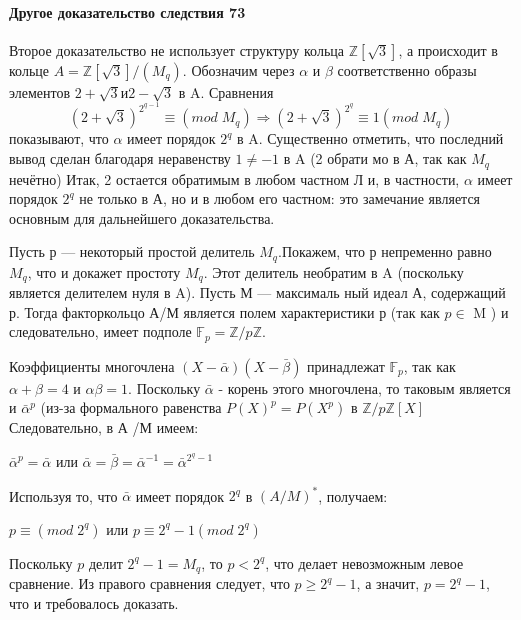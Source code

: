 \documentclass{mai_book}
\begin{document}
	\paragraph{Другое доказательство следствия 73}
	\noindent
	
	Второе доказательство не использует структуру кольца $\mathbb Z[\sqrt{3}]$, а	происходит в кольце $A =\mathbb Z[\sqrt{3}] /(M_q).$ Обозначим через $\alpha$ и $\beta$ соответственно образы элементов $2+\sqrt{3} и 2-\sqrt{3}$ в A. Сравнения \\
	\begin{equation}
	(2+\sqrt{3})^{2^{q-1}} \equiv (mod\;M_q) \Rightarrow (2+\sqrt{3})^{2^q} \equiv 1 (mod\;M_q)
	\end{equation}
	показывают, что $\alpha$ имеет порядок $2^q$ в A. Существенно отметить, что последний вывод сделан благодаря неравенству $1\neq-1$ в A  (2 обрати­
	мо в А, так как $M_q$ нечётно) Итак, 2 остается обратимым в любом частном Л и, в частности, $\alpha$  имеет порядок $2^q$ не только в А, но и в любом его частном: это замечание является основным для дальнейшего	доказательства.
	
	Пусть р — некоторый простой делитель $M_q$.Покажем, что р непременно равно $M_q$, что и докажет простоту $M_q$. Этот делитель необратим	в A (поскольку является делителем нуля в A). Пусть М  — максималь­
	ный идеал А, содержащий р. Тогда факторкольцо А/М является полем	характеристики р (так как $p \in$ M ) и
	следовательно, имеет подполе $\mathbb F_p = \mathbb Z/p \mathbb Z$.
	
	Коэффициенты многочлена $(X-\bar\alpha)(X-\bar\beta)$ принадлежат $\mathbb F_p$, так как  $\alpha+\beta = 4$ и $\alpha\beta=1$. Поскольку $\bar\alpha$ - корень этого многочлена, то таковым является и $\bar\alpha^p$ (из-за формального равенства $P(X)^p = P(X^p)$ в $\mathbb Z/p \mathbb Z[X]$ Следовательно, в А /М имеем:
	

	\begin{center}
		$\bar{\alpha}^p = \bar{\alpha}$ или 
		$\bar{\alpha}=\bar{\beta}=\bar{\alpha}^{-1}=\bar{\alpha}^{2^q-1}$
	\end{center}
	 Используя то, что $\bar{\alpha}$ имеет порядок $2^q$ в  $(A/M)^{*}$, получаем:
	 
	 \begin{center}
	 	$p\equiv (mod \; 2^q)$ или $ p\equiv2^q-1 (mod \; 2^q)$
	 \end{center}
     Поскольку $p$ делит $2^q-1 = M_q$, то $p<2^q$, что делает невозможным левое сравнение. Из правого сравнения следует, что $p\geqslant 2^q-1$, а значит, $p=2^q-1$, что и требовалось доказать.
     
\end{document}
